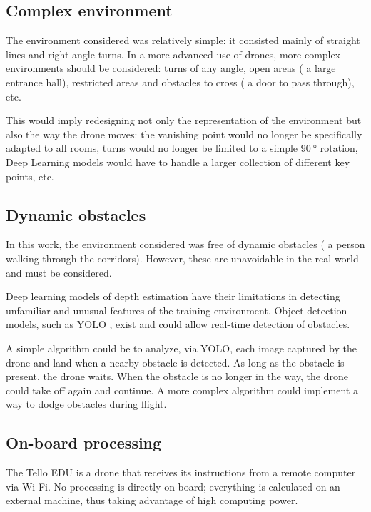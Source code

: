 \subsection{Complex environment}

The environment considered was relatively simple: it consisted mainly of straight lines and right-angle turns. In a more advanced use of drones, more complex environments should be considered: turns of any angle, open areas (\eg{} a large entrance hall), restricted areas and obstacles to cross (\eg{} a door to pass through), etc.

This would imply redesigning not only the representation of the environment but also the way the drone moves: the vanishing point would no longer be specifically adapted to all rooms, turns would no longer be limited to a simple $\SI{90}{\degree}$ rotation, Deep Learning models would have to handle a larger collection of different key points, etc.

\subsection{Dynamic obstacles}

In this work, the environment considered was free of dynamic obstacles (\eg{} a person walking through the corridors). However, these are unavoidable in the real world and must be considered.

Deep learning models of depth estimation have their limitations in detecting unfamiliar and unusual features of the training environment. Object detection models, such as YOLO \cite{redmon2016you}, exist and could allow real-time detection of obstacles.

A simple algorithm could be to analyze, via YOLO, each image captured by the drone and land when a nearby obstacle is detected. As long as the obstacle is present, the drone waits. When the obstacle is no longer in the way, the drone could take off again and continue. A more complex algorithm could implement a way to dodge obstacles during flight.

\subsection{On-board processing}

The Tello EDU is a drone that receives its instructions from a remote computer via Wi-Fi. No processing is directly on board; everything is calculated on an external machine, thus taking advantage of high computing power.

